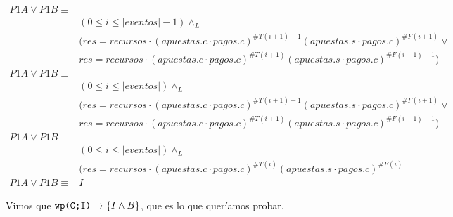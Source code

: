 \documentclass[../document.tex]{subfiles}
\begin{document}
\begin{equation}
\begin{split}
P1A \lor P1B \equiv \\
    &(0\leq i \leq |eventos|-1 )\land_L\\
    &(res = recursos \cdot (apuestas.c\cdot pagos.c)^{\#T(i+1)-1}(apuestas.s\cdot pagos.c)^{\#F(i+1)} \lor \\
    & res = recursos \cdot (apuestas.c\cdot pagos.c)^{\#T(i+1)}(apuestas.s\cdot pagos.c)^{\#F(i+1)-1})\\
P1A \lor P1B \equiv \\
    &(0\leq i \leq |eventos|)\land_L\\
    &(res = recursos \cdot (apuestas.c\cdot pagos.c)^{\#T(i+1)-1}(apuestas.s\cdot pagos.c)^{\#F(i+1)} \lor \\
    & res = recursos \cdot (apuestas.c\cdot pagos.c)^{\#T(i+1)}(apuestas.s\cdot pagos.c)^{\#F(i+1)-1})\\
P1A \lor P1B \equiv \\
    &(0\leq i \leq |eventos|)\land_L\\
    &(res = recursos \cdot (apuestas.c\cdot pagos.c)^{\#T(i)}(apuestas.s\cdot pagos.c)^{\#F(i)}\\
P1A \lor P1B \equiv & I
\end{split}
\end{equation}

Vimos que $\verb+wp(C;I)+ \to \{I \land B\}$, que es lo que queríamos probar.
\end{document}
